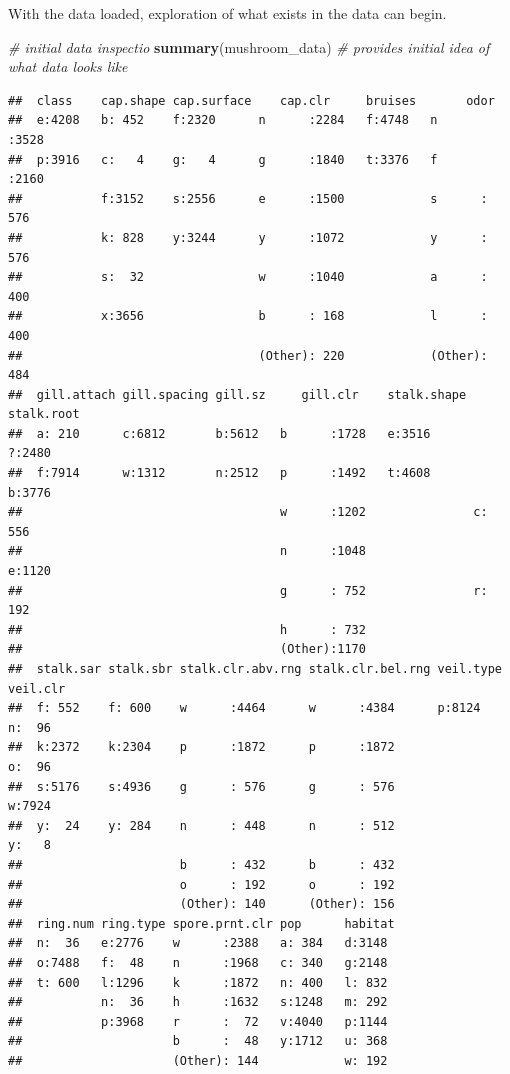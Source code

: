 \documentclass[
  english,
  man]{apa6}
\newenvironment{Shaded}{\begin{snugshade}}{\end{snugshade}}
\newcommand{\CommentTok}[1]{\textcolor[rgb]{0.56,0.35,0.01}{\textit{#1}}}
\newcommand{\KeywordTok}[1]{\textcolor[rgb]{0.13,0.29,0.53}{\textbf{#1}}}
\newcommand{\NormalTok}[1]{#1}
\begin{document}
With the data loaded, exploration of what exists in the data can begin.

\begin{Shaded}
\begin{Highlighting}[]
\CommentTok{# initial data inspectio}
\KeywordTok{summary}\NormalTok{(mushroom_data) }\CommentTok{# provides initial idea of what data looks like}
\end{Highlighting}
\end{Shaded}

\begin{verbatim}
##  class    cap.shape cap.surface    cap.clr     bruises       odor     
##  e:4208   b: 452    f:2320      n      :2284   f:4748   n      :3528  
##  p:3916   c:   4    g:   4      g      :1840   t:3376   f      :2160  
##           f:3152    s:2556      e      :1500            s      : 576  
##           k: 828    y:3244      y      :1072            y      : 576  
##           s:  32                w      :1040            a      : 400  
##           x:3656                b      : 168            l      : 400  
##                                 (Other): 220            (Other): 484  
##  gill.attach gill.spacing gill.sz     gill.clr    stalk.shape stalk.root
##  a: 210      c:6812       b:5612   b      :1728   e:3516      ?:2480    
##  f:7914      w:1312       n:2512   p      :1492   t:4608      b:3776    
##                                    w      :1202               c: 556    
##                                    n      :1048               e:1120    
##                                    g      : 752               r: 192    
##                                    h      : 732                         
##                                    (Other):1170                         
##  stalk.sar stalk.sbr stalk.clr.abv.rng stalk.clr.bel.rng veil.type veil.clr
##  f: 552    f: 600    w      :4464      w      :4384      p:8124    n:  96  
##  k:2372    k:2304    p      :1872      p      :1872                o:  96  
##  s:5176    s:4936    g      : 576      g      : 576                w:7924  
##  y:  24    y: 284    n      : 448      n      : 512                y:   8  
##                      b      : 432      b      : 432                        
##                      o      : 192      o      : 192                        
##                      (Other): 140      (Other): 156                        
##  ring.num ring.type spore.prnt.clr pop      habitat 
##  n:  36   e:2776    w      :2388   a: 384   d:3148  
##  o:7488   f:  48    n      :1968   c: 340   g:2148  
##  t: 600   l:1296    k      :1872   n: 400   l: 832  
##           n:  36    h      :1632   s:1248   m: 292  
##           p:3968    r      :  72   v:4040   p:1144  
##                     b      :  48   y:1712   u: 368  
##                     (Other): 144            w: 192
\end{verbatim}
\end{document}
